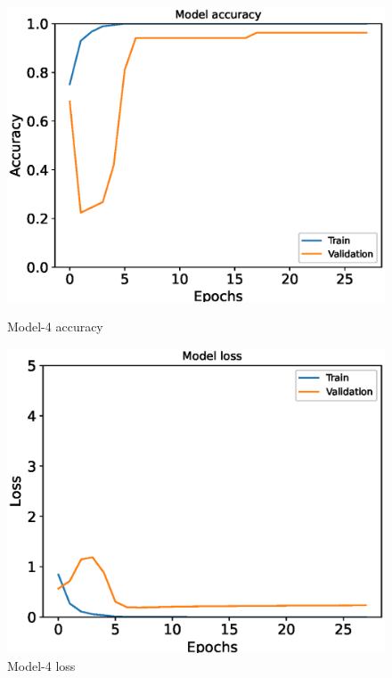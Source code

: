 \begin{figure}[H]
    \centering
    \begin{minipage}{0.45\textwidth}
        \centering
        \includegraphics[width=\textwidth]{./fig/model4/accuracy4.eps}
        \caption{Model-4 accuracy}
        \label{fig:model4_accuracy}
    \end{minipage}
    \begin{minipage}{0.45\textwidth}
        \centering
        \includegraphics[width=\textwidth]{./fig/model4/loss4.eps}
        \caption{Model-4 loss}
        \label{fig:model4_loss}
    \end{minipage}
\end{figure}

